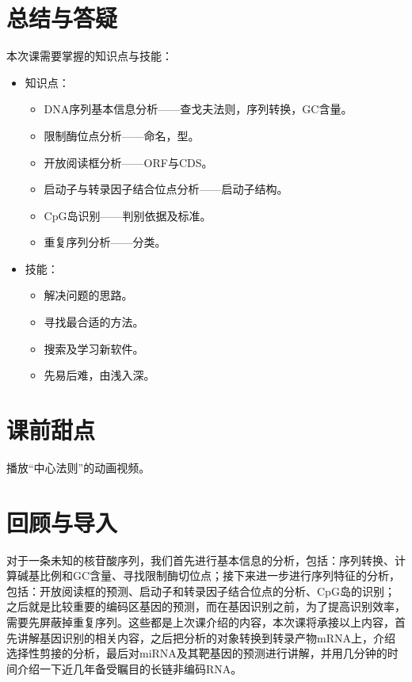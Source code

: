 \section{总结与答疑}
本次课需要掌握的知识点与技能：
\begin{itemize}
	\item 知识点：
		\begin{itemize}
			\item DNA序列基本信息分析——查戈夫法则，序列转换，GC含量。
			\item 限制酶位点分析——命名，型。
			\item 开放阅读框分析——ORF与CDS。
			\item 启动子与转录因子结合位点分析——启动子结构。
			\item CpG岛识别——判别依据及标准。
			\item 重复序列分析——分类。
		\end{itemize}
	\item 技能：
		\begin{itemize}
			\item 解决问题的思路。
			\item 寻找最合适的方法。
			\item 搜索及学习新软件。
			\item 先易后难，由浅入深。
		\end{itemize}
\end{itemize}

\section{课前甜点} 
播放“中心法则”的动画视频。

\section{回顾与导入}
对于一条未知的核苷酸序列，我们首先进行基本信息的分析，包括：序列转换、计算碱基比例和GC含量、寻找限制酶切位点；接下来进一步进行序列特征的分析，包括：开放阅读框的预测、启动子和转录因子结合位点的分析、CpG岛的识别；之后就是比较重要的编码区基因的预测，而在基因识别之前，为了提高识别效率，需要先屏蔽掉重复序列。这些都是上次课介绍的内容，本次课将承接以上内容，首先讲解基因识别的相关内容，之后把分析的对象转换到转录产物mRNA上，介绍选择性剪接的分析，最后对miRNA及其靶基因的预测进行讲解，并用几分钟的时间介绍一下近几年备受瞩目的长链非编码RNA。

